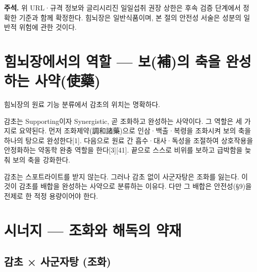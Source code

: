 \documentclass[12pt,oneside]{book}
\newenvironment{authnote}
  {\par\smallskip\begingroup\leftskip=6mm\rightskip=3mm\small\color{muted}\noindent\ignorespaces}
  {\par\endgroup\smallskip}
\begin{document}
\begin{authnote}\textbf{주석.} 위 URL·규격 정보와 글리시리진 일일섭취 권장 상한은 후속 검증 단계에서 정확한 기준과 함께 확정한다. 힘뇌장은 일반식품이며, 본 절의 안전성 서술은 성분의 일반적 위험에 관한 것이다.\end{authnote}

\section{힘뇌장에서의 역할 — 보(補)의 축을 완성하는 사약(使藥)}

힘뇌장의 원료 기능 분류에서 감초의 위치는 명확하다.

\vspace{2pt}\vspace{3pt}

감초는 Supporting이자 Synergistic, 곧 조화하고 완성하는 사약이다. 그 역할은 세 가지로 요약된다. 먼저 조화제약(調和諸藥)으로 인삼·백출·복령을 조화시켜 보의 축을 하나의 탕으로 완성한다[1]. 다음으로 원료 간 흡수·대사·독성을 조절하여 상호작용을 안정화하는 약동학 완충 역할을 한다[3][41]. 끝으로 스스로 비위를 보하고 급박함을 늦춰 보의 축을 강화한다.

감초는 스포트라이트를 받지 않는다. 그러나 감초 없이 사군자탕은 조화를 잃는다. 이것이 감초를 배합을 완성하는 사약으로 분류하는 이유다. 다만 그 배합은 안전성(§9)을 전제로 한 적정 용량이어야 한다.

\section{시너지 — 조화와 해독의 약재}

\subsection{감초 × 사군자탕 (조화)}
\end{document}
